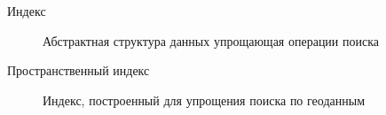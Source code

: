   \Defines %
\begin{description}
    \item[Индекс] Абстрактная структура данных упрощающая операции поиска
    \item[Пространственный индекс] Индекс, построенный для упрощения поиска по геоданным
\end{description}


